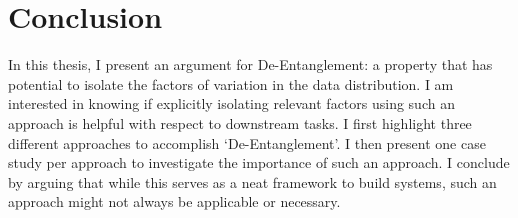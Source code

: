 \chapter{Conclusion}

In this thesis, I present an argument for De-Entanglement: a property that has potential to isolate the factors of variation in the data distribution. I am interested in knowing if explicitly isolating relevant factors using such an approach is helpful with respect to downstream tasks. I first highlight three different approaches to accomplish `De-Entanglement'.  I then present one case study per approach to investigate the importance of such an approach. I conclude by arguing that while this serves as a neat framework to build systems, such an approach might not always be applicable or necessary.